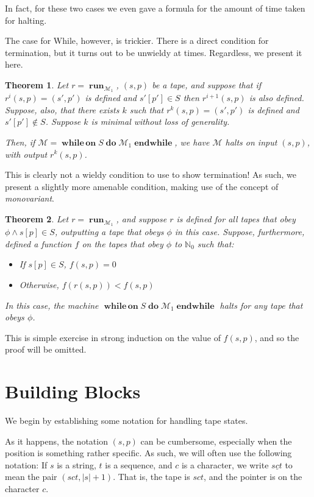 \documentclass{article}
\newtheorem{theorem}{Theorem}
\newcommand{\N}{\mathbb{N}}
\newcommand{\M}{\mathcal{M}}
\DeclareMathOperator{\run}{\mathbf{run}}
\DeclareMathOperator{\Nwhileon}{\mathbf{while\,on}}
\DeclareMathOperator{\Ndo}{\mathbf{do}}
\DeclareMathOperator{\Nendwhile}{\mathbf{endwhile}}
\begin{document}
	In fact, for these two cases we even gave a formula for the amount of time taken for halting.
	
	The case for While, however, is trickier. There is a direct condition for termination, but it turns out to be unwieldy at times. Regardless, we present it here.
	
	\begin{theorem}
	Let $r = \run_{\M_1}$, $(s,p)$ be a tape, and suppose that if $r^i(s,p) = (s', p')$ is defined and $s'[p'] \in S$ then $r^{i+1}(s,p)$ is also defined. Suppose, also, that there exists $k$ such that $r^k(s,p) = (s', p')$ is defined and $s'[p'] \not \in S$. Suppose $k$ is minimal without loss of generality.
	
	Then, if $\M = \Nwhileon S \Ndo \M_1 \Nendwhile$, we have $\M$ halts on input $(s,p)$, with output $r^k(s,p)$.
	\end{theorem}
	
	This is clearly not a wieldy condition to use to show termination! As such, we present a slightly more amenable condition, making use of the concept of \emph{monovariant}.
	
	\begin{theorem}
	Let $r = \run_{\M_1}$, and suppose $r$ is defined for all tapes that obey $\phi \land s[p] \in S$, outputting a tape that obeys $\phi$ in this case. Suppose, furthermore, defined a function $f$ on the tapes that obey $\phi$ to $\N_0$ such that:
	
	\begin{itemize}
	\item If $s[p] \in S$, $f(s,p) = 0$
	\item Otherwise, $f(r(s,p)) < f(s,p)$
	\end{itemize}
	
	In this case, the machine $\Nwhileon S \Ndo \M_1 \Nendwhile$ halts for any tape that obeys $\phi$.
	\end{theorem}
	
	This is simple exercise in strong induction on the value of $f(s,p)$, and so the proof will be omitted.
	
	\section{Building Blocks}
	
	We begin by establishing some notation for handling tape states.
	
	As it happens, the notation $(s, p)$ can be cumbersome, especially when the position is something rather specific. As such, we will often use the following notation: If $s$ is a string, $t$ is a sequence, and $c$ is a character, we write $s \underline c t$ to mean the pair $(sct, \lvert s \rvert + 1)$. That is, the tape is $sct$, and the pointer is on the character $c$.
	
\end{document}
